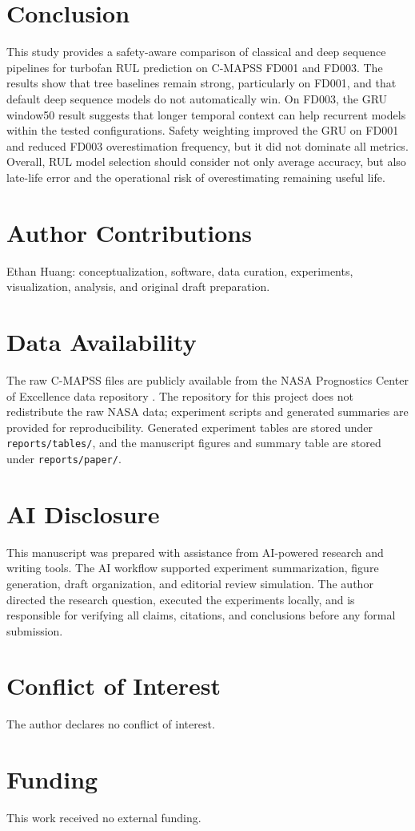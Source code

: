 \documentclass[11pt,a4paper]{article}
\begin{document}
\section{Conclusion}

This study provides a safety-aware comparison of classical and deep sequence pipelines for turbofan RUL prediction on C-MAPSS FD001 and FD003. The results show that tree baselines remain strong, particularly on FD001, and that default deep sequence models do not automatically win. On FD003, the GRU window50 result suggests that longer temporal context can help recurrent models within the tested configurations. Safety weighting improved the GRU on FD001 and reduced FD003 overestimation frequency, but it did not dominate all metrics. Overall, RUL model selection should consider not only average accuracy, but also late-life error and the operational risk of overestimating remaining useful life.

\section*{Author Contributions}

Ethan Huang: conceptualization, software, data curation, experiments, visualization, analysis, and original draft preparation.

\section*{Data Availability}

The raw C-MAPSS files are publicly available from the NASA Prognostics Center of Excellence data repository \citep{NASA_PCoE}. The repository for this project does not redistribute the raw NASA data; experiment scripts and generated summaries are provided for reproducibility. Generated experiment tables are stored under \texttt{reports/tables/}, and the manuscript figures and summary table are stored under \texttt{reports/paper/}.

\section*{AI Disclosure}

This manuscript was prepared with assistance from AI-powered research and writing tools. The AI workflow supported experiment summarization, figure generation, draft organization, and editorial review simulation. The author directed the research question, executed the experiments locally, and is responsible for verifying all claims, citations, and conclusions before any formal submission.

\section*{Conflict of Interest}

The author declares no conflict of interest.

\section*{Funding}

This work received no external funding.



\end{document}
